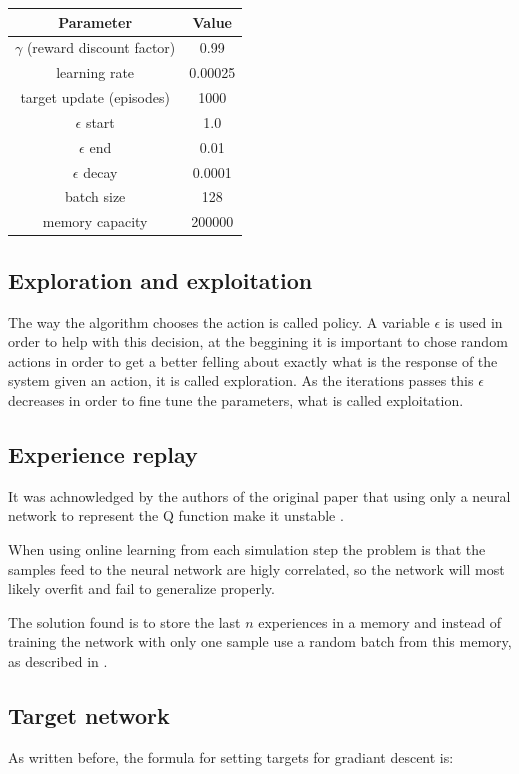 \documentclass{article}
\newcommand{\targetUpdate}{1000}
\begin{document}
\begin{center}
\begin{tabular}{ |c|c| }
 \hline
 \textbf{Parameter} & \textbf{Value} \\ 
 \hline
 $\gamma$ (reward discount factor) & 0.99 \\ 
 learning rate & 0.00025 \\
 target update (episodes) & \targetUpdate{} \\ 
 $\epsilon$ start & 1.0 \\ 
 $\epsilon$ end & 0.01 \\ 
 $\epsilon$ decay & 0.0001 \\ 
 batch size & 128 \\ 
 memory capacity & 200000 \\ 
 \hline
\end{tabular}
\end{center}

\subsection{Exploration and exploitation}
The way the algorithm chooses the action is called policy. A variable $\epsilon$ is used in order to help with this decision, at the beggining it is important to chose random actions in order to get a better felling about exactly what is the response of the system given an action, it is called exploration. As the iterations passes this $\epsilon$ decreases in order to fine tune the parameters, what is called exploitation.

\subsection{Experience replay}
It was achnowledged by the authors of the original paper that using only a neural network to represent the Q function make it unstable \cite{deepQLearning}.

When using online learning from each simulation step the problem is that the samples feed to the neural network are higly correlated, so the network will most likely overfit and fail to generalize properly.

The solution found is to store the last $n$ experiences in a memory and instead of training the network with only one sample use a random batch from this memory, as described in \cite{experienceReplay}.

\subsection{Target network}
As written before, the formula for setting targets for gradiant descent is:
\end{document}
